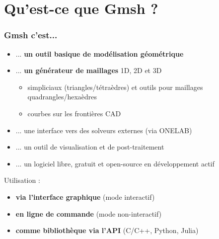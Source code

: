 \documentclass[aspectratio=169]{beamer}
\begin{document}
\section{Qu'est-ce que Gmsh ?}
\begin{frame}[fragile]
\frametitle{Gmsh c'est...}
\begin{itemize}
  \item ... \textbf{un outil basique de modélisation géométrique}
  \item ... \textbf{un générateur de maillages} 1D, 2D et 3D
  \begin{itemize}
    \item simpliciaux (triangles/tétraèdres) et outils pour maillages quadrangles/hexaèdres
    \item courbes sur les frontières CAD
  \end{itemize}
  \item ... une interface vers des solveurs externes (via ONELAB)
  \item ... un outil de visualisation et de post-traitement
  \item ... un logiciel libre, gratuit et open-source en développement actif
\end{itemize}
Utilisation :
\begin{itemize}
  \item \textbf{via l'interface graphique} (mode interactif)
  \item \textbf{en ligne de commande} (mode non-interactif)
  \item \textbf{comme bibliothèque via l'API} (C/C++, Python, Julia)
\end{itemize}
\end{frame}
\end{document}

